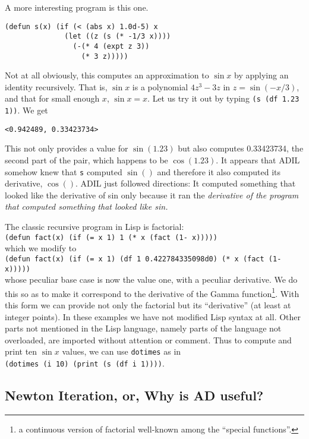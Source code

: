 \documentclass{article}
\begin{document}
{A more interesting program is this one.
\begin{verbatim}
(defun s(x) (if (< (abs x) 1.0d-5) x 
              (let ((z (s (* -1/3 x))))
                (-(* 4 (expt z 3))
                  (* 3 z)))))
\end{verbatim}
Not at all obviously, this computes an approximation to $\sin x$ by
applying an identity recursively. That is, $\sin x$ is a polynomial
$4z^3-3z$ in $z=\sin (-x/3)$, and that for small enough $x$, $\sin x =
x$. Let us try it out by typing {\tt (s (df 1.23 1))}.  We get
\begin{verbatim}
<0.942489, 0.33423734>
\end{verbatim}
This not only provides a value for $\sin(1.23)$
but also computes 0.33423734, the second part of the pair, which happens to be
$\cos(1.23)$.
It appears that ADIL somehow knew that {\tt s} computed $\sin()$ and
therefore it also computed its derivative, $\cos()$. 
ADIL just followed directions:  It computed something that looked like
the derivative of sin only because it ran the {\em derivative of the program
that computed something that looked like sin.}
\medskip

The classic recursive program in Lisp is factorial:\\
{\tt (defun fact(x) (if (= x 1) 1 (* x (fact (1- x)))))}\\
which we modify to\\
{\tt (defun fact(x) (if (= x 1) (df 1 0.422784335098d0) (* x (fact (1- x)))))}\\
whose peculiar base case is now the value one, with a peculiar
derivative.
We do this so as to make it correspond to the 
derivative of the Gamma function\footnote{a continuous
version of factorial well-known among the ``special functions''.}. 
With this form we can provide not only
the factorial but its ``derivative'' (at least at integer points).
\medskip
In these examples we have not modified Lisp syntax at all.  Other parts
not mentioned in the Lisp language, namely parts of the language not overloaded,
are imported without attention or comment. Thus to
compute and print ten $\sin x$ values, we can use {\tt dotimes} as in\\
{\tt (dotimes (i 10) (print (s (df i 1))))}.

\subsection{Newton Iteration, or, Why is AD useful?}

}
\end{document}
